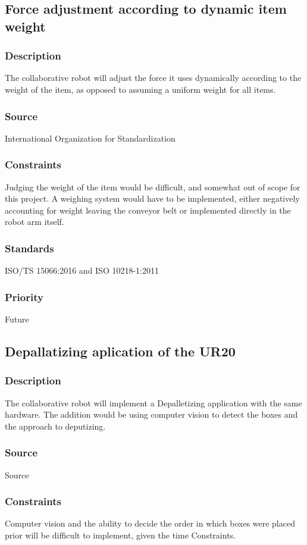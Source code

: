 \subsection{Force adjustment according to dynamic item weight}
\subsubsection{Description}
The collaborative robot will adjust the force it uses dynamically according to the weight of the item, as opposed to assuming a uniform weight for all items.
\subsubsection{Source}
International Organization for Standardization
\subsubsection{Constraints}
Judging the weight of the item would be difficult, and somewhat out of scope for this project. A weighing system would have to be implemented, either negatively accounting for weight leaving the conveyor belt or implemented directly in the robot arm itself.
\subsubsection{Standards}
ISO/TS 15066:2016 and ISO 10218-1:2011
\subsubsection{Priority}
Future

\subsection{Depallatizing aplication of the UR20}
\subsubsection{Description}
The collaborative robot will implement a Depalletizing application with the same hardware. The addition would be using computer vision to detect the boxes and the approach to deputizing.
\subsubsection{Source}
Source
\subsubsection{Constraints}
Computer vision and the ability to decide the order in which boxes were placed prior will be difficult to implement, given the time Constraints.
